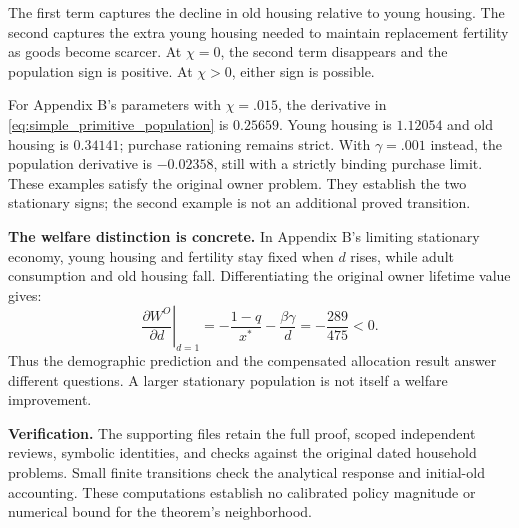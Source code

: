 \documentclass[11pt]{article}
\begin{document}
The first term captures the decline in old housing relative to young housing.
The second captures the extra young housing needed to maintain replacement
fertility as goods become scarcer. At $\chi=0$, the second term disappears
and the population sign is positive. At $\chi>0$, either sign is possible.

For Appendix B's parameters with $\chi=.015$, the derivative in
\eqref{eq:simple_primitive_population} is $0.25659$. Young housing is $1.12054$
and old housing is $0.34141$; purchase rationing remains strict. With
$\gamma=.001$ instead, the population derivative is $-0.02358$, still with a
strictly binding purchase limit. These examples satisfy the original owner
problem. They establish the two stationary signs; the second example is not
an additional proved transition.

\textbf{The welfare distinction is concrete.} In Appendix B's limiting
stationary economy, young housing and fertility stay fixed when $d$ rises,
while adult consumption and old housing fall. Differentiating the original
owner lifetime value gives:
\begin{equation}
 \left.\frac{\partial W^O}{\partial d}\right|_{d=1}
 =-\frac{1-q}{x^*}-\frac{\beta\gamma}{d}
 =-\frac{289}{475}<0.
\end{equation}
Thus the demographic prediction and the compensated allocation result answer
different questions. A larger stationary population is not itself a welfare
improvement.

\textbf{Verification.} The supporting files retain the full proof, scoped
independent reviews, symbolic identities, and checks against the original
dated household problems. Small finite transitions check the analytical
response and initial-old accounting. These computations establish no
calibrated policy magnitude or numerical bound for the theorem's neighborhood.
\end{document}

